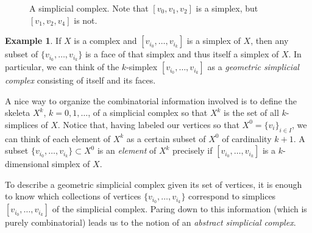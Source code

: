 \documentclass[12pt]{article}
\theoremstyle{plain}
\theoremstyle{definition}
\newtheorem{example}[theorem]{Example}
\begin{document}
\begin{figure}[!htp]
\begin{center}
\end{center}
\caption{A simplicial complex. Note that  $[v_0,v_1,v_2]$ is a simplex, but $[v_1,v_2,v_4]$ is not.}\label{F: fig1}
\end{figure}


\begin{example}\label{E: simplex/complex}
If $X$ is a complex and $[v_{i_0},\ldots, v_{i_k}]$ is a simplex of $X$, then any subset of $\{v_{i_0},\ldots, v_{i_k}\}$ is a face of that simplex and thus itself a simplex of $X$. In particular, we can think of the $k$-simplex $[v_{i_0},\ldots, v_{i_k}]$  as a  \emph{geometric simplicial complex} consisting of itself and its faces. 
\end{example}


A nice way to organize the combinatorial information involved is to define the skeleta $X^k$, $k=0,1,\ldots$, of a simplicial complex so that $X^k$ is the set of all $k$-simplices of $X$. Notice that, having labeled our vertices so that  $X^0=\{v_i\}_{i\in I}$, we can think of each element of $X^k$ as a certain subset of $X^0$ of cardinality $k+1$. A subset $\{v_{i_0},\ldots, v_{i_k}\}\subset X^0$ is an \emph{element} of $X^k$ precisely if $[v_{i_0},\ldots, v_{i_k}]$ is a $k$-dimensional simplex of $X$. 


To describe a geometric simplicial complex given its set of vertices, it is enough to know which collections of vertices $\{v_{i_0},\ldots, v_{i_k}\}$ correspond to simplices $[v_{i_0},\ldots, v_{i_k}]$ of the simplicial complex. Paring down to this information (which is purely combinatorial) 
leads us  to the notion of an \emph{abstract simplicial complex}. 
\end{document}
